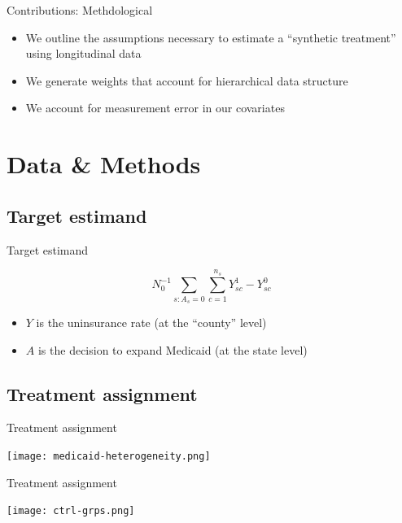 \documentclass[hyperref={pdfpagelabels=false}]{beamer}
\begin{document}
\begin{frame}{Contributions: Methdological}
\begin{itemize}
    \item We outline the assumptions necessary to estimate a ``synthetic treatment'' using longitudinal data \bigskip
    
    \item We generate weights that account for hierarchical data structure \bigskip
    
    \item We account for measurement error in our covariates \bigskip
    \end{itemize}
\end{frame}

\section{Data \& Methods}

\subsection{Target estimand}

\begin{frame}{Target estimand}

$$
N_0^{-1}\sum_{s: A_s = 0} \sum_{c = 1}^{n_s} Y_{sc}^1 - Y_{sc}^0
$$

\begin{itemize}
    \item $Y$ is the uninsurance rate (at the ``county'' level) \bigskip
    \item $A$ is the decision to expand Medicaid (at the state level)   
\end{itemize}
\end{frame}

\subsection{Treatment assignment}

\begin{frame}{Treatment assignment}
    \begin{center}
	\texttt{[image: medicaid-heterogeneity.png]}
    \end{center}
\end{frame}

\begin{frame}{Treatment assignment}
    \begin{center}
	\texttt{[image: ctrl-grps.png]}  
    \end{center}
\end{frame}
\end{document}
